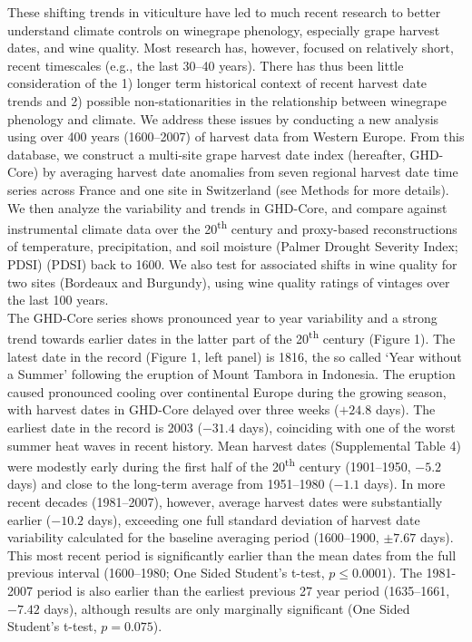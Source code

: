 \documentclass[final]{nature}
\begin{document}
\indent These shifting trends in viticulture have led to much recent research to better understand climate controls on winegrape phenology\cite{Fila2015,odo2012,webb2012}, especially grape harvest dates, and wine quality\cite{coombe1987,jones2005,vanlee2009}.  Most research has, however, focused on relatively short, recent timescales (e.g., the last 30--40 years\cite{Duchene:2005bd,tomasi2011,webb2012}). There has thus been little consideration of the 1) longer term historical context of recent harvest date trends and 2) possible non-stationarities in the relationship between winegrape phenology and climate. We address these issues by conducting a new analysis using over 400 years (1600--2007) of harvest data from Western Europe\cite{Daux2012}. From this database, we construct a multi-site grape harvest date index (hereafter, GHD-Core) by averaging harvest date anomalies from seven regional harvest date time series across France and one site in Switzerland (see Methods for more details). We then analyze the variability and trends in GHD-Core, and compare against instrumental climate data over the 20\textsuperscript{th} century\cite{Harris2014} and proxy-based reconstructions of temperature\cite{Luterbacher2004}, precipitation\cite{Pauling2006}, and soil moisture (Palmer Drought Severity Index; PDSI)\cite{CookOWDA2015} (PDSI) back to 1600. We also test for associated shifts in wine quality for two sites (Bordeaux and Burgundy), using wine quality ratings of vintages over the last 100 years\cite{Broadbent2002}.\\
\indent The GHD-Core series shows pronounced year to year variability and a strong trend towards earlier dates in the latter part of the 20\textsuperscript{th} century (Figure 1). The latest date in the record (Figure 1, left panel) is 1816, the so called `Year without a Summer' following the eruption of Mount Tambora in Indonesia\cite{Oppenheimer2003}. The eruption caused pronounced cooling over continental Europe during the growing season, with harvest dates in GHD-Core delayed over three weeks ($+24.8$ days). The earliest date in the record is 2003 ($-31.4$ days), coinciding with one of the worst summer heat waves in recent history\cite{Rebetz2006}. Mean harvest dates (Supplemental Table 4) were modestly early during the first half of the 20\textsuperscript{th} century (1901--1950, $-5.2$ days) and close to the long-term average from 1951--1980 ($-1.1$ days). In more recent decades (1981--2007), however, average harvest dates were substantially earlier ($-10.2$ days), exceeding one full standard deviation of harvest date variability calculated for the baseline averaging period (1600--1900, $\pm7.67$ days). This most recent period is significantly earlier than the mean dates from the full previous interval (1600--1980; One Sided Student's t-test, $p\le0.0001$). The 1981-2007 period is also earlier than the earliest previous 27 year period (1635--1661, $-7.42$ days), although results are only marginally significant (One Sided Student's t-test, $p=0.075$).\\
\end{document}
